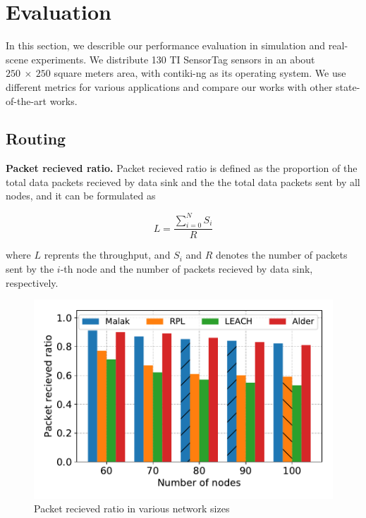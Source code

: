 \section{Evaluation}
\label{Eva}

In this section, we describle our performance evaluation in simulation and
real-scene experiments. We distribute 130 TI SensorTag sensors in an about
$250~\times~250$ square meters area, with contiki-ng as its operating system. We
use different metrics for various applications and compare our works with other
state-of-the-art works.

\subsection{Routing}

\textbf{Packet recieved ratio.}
Packet recieved ratio is defined as the proportion of the total data packets
recieved by data sink and the the total data packets sent by all nodes, and it
can be formulated as

\begin{equation}
	L = \frac{\sum_{i = 0}^{N}S_i}{R}
\end{equation}

where $L$ reprents the throughput, and $S_i$ and $R$ denotes the number of
packets sent by the $i$-th node and the number of packets recieved by data
sink, respectively.


\begin{figure}[htbp]
	\centering
	\includegraphics[width=.85\columnwidth]{Figure/packet_loss_ratio_with_size}
	\vspace{-0.1in}
	\caption{Packet recieved ratio in various network sizes
		\textnormal{
		}}
	\label{fig:packet_loss_ratio_with_size}
\end{figure}

